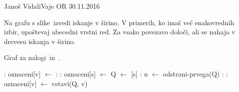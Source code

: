 
\begin{naloga}{Janoš Vidali}{Vaje OR 30.11.2016}
\begin{vprasanje}
Na grafu s slike~\fig izvedi iskanje v širino.
V primerih, ko imaš več ena\-ko\-vred\-nih izbir,
upoštevaj abecedni vrstni red.
Za vsako povezavo določi, ali se nahaja v drevesu iskanja v širino.

\begin{slika}
\pgfslika
\caption{Graf za nalogi~\nal in~\nal[dfs].}
\end{slika}
\end{vprasanje}

\begin{odgovor}

\begin{small}
\begin{algorithmic}
	:
		\State oznaceni[v] $\gets$ \False
	\EndFor
	:
		:
			\State oznaceni[s] $\gets$ \True
			\State Q $\gets$ [s]
			:
				\State u $\gets$ odstrani-prvega(Q)
				:
					:
						\State oznaceni[v] $\gets$ \True
						\State vstavi(Q, v)
					\EndIf
				\EndFor
			\EndWhile
		\EndIf
	\EndFor
		

\end{algorithmic}
\end{small}
\end{odgovor}
\end{naloga}
